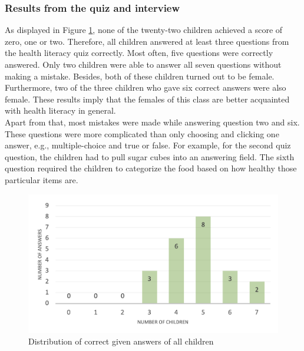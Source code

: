 \subsubsection{Results from the quiz and interview}
As displayed in Figure \ref{figure:CorrAnswers}, none of the twenty-two children achieved a score of zero, one or two. Therefore, all children answered at least three questions from the health literacy quiz correctly. Most often, five questions were correctly answered. Only two children were able to answer all seven questions without making a mistake. Besides, both of these children turned out to be female. Furthermore, two of the three children who gave six correct answers were also female. These results imply that the females of this class are better acquainted with health literacy in general.\\
Apart from that, most mistakes were made while answering question two and six. These questions were more complicated than only choosing and clicking one answer, e.g., multiple-choice and true or false. For example, for the second quiz question, the children had to pull sugar cubes into an answering field. The sixth question required the children to categorize the food based on how healthy those particular items are. 
\begin{figure}[!ht]
    \centering
    \includegraphics[width=1 \linewidth]{images/num_corr_answers.png}
    \caption{
        Distribution of correct given answers of all children
    }
    \label{figure:CorrAnswers}
\end{figure}

